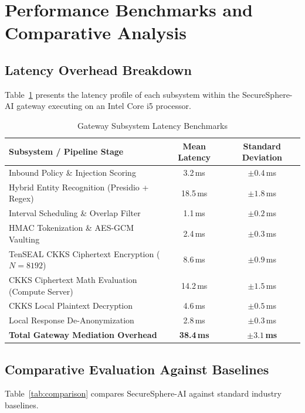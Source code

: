 \section{Performance Benchmarks and Comparative Analysis}

\subsection{Latency Overhead Breakdown}
Table~\ref{tab:latency_benchmarks} presents the latency profile of each subsystem within the SecureSphere-AI gateway executing on an Intel Core i5 processor.

\begin{table}[htbp]
\centering
\caption{Gateway Subsystem Latency Benchmarks}\label{tab:latency_benchmarks}
\begin{tabular}{lcc}
\toprule
\textbf{Subsystem / Pipeline Stage} & \textbf{Mean Latency} & \textbf{Standard Deviation} \\
\midrule
Inbound Policy \& Injection Scoring & 3.2\,ms & $\pm 0.4$\,ms \\
Hybrid Entity Recognition (Presidio + Regex) & 18.5\,ms & $\pm 1.8$\,ms \\
Interval Scheduling \& Overlap Filter & 1.1\,ms & $\pm 0.2$\,ms \\
HMAC Tokenization \& AES-GCM Vaulting & 2.4\,ms & $\pm 0.3$\,ms \\
TenSEAL CKKS Ciphertext Encryption ($N=8192$) & 8.6\,ms & $\pm 0.9$\,ms \\
CKKS Ciphertext Math Evaluation (Compute Server) & 14.2\,ms & $\pm 1.5$\,ms \\
CKKS Local Plaintext Decryption & 4.6\,ms & $\pm 0.5$\,ms \\
Local Response De-Anonymization & 2.8\,ms & $\pm 0.3$\,ms \\
\midrule
\textbf{Total Gateway Mediation Overhead} & \textbf{38.4\,ms} & \textbf{$\pm 3.1$\,ms} \\
\bottomrule
\end{tabular}
\end{table}

\subsection{Comparative Evaluation Against Baselines}
Table~\ref{tab:comparison} compares SecureSphere-AI against standard industry baselines.

